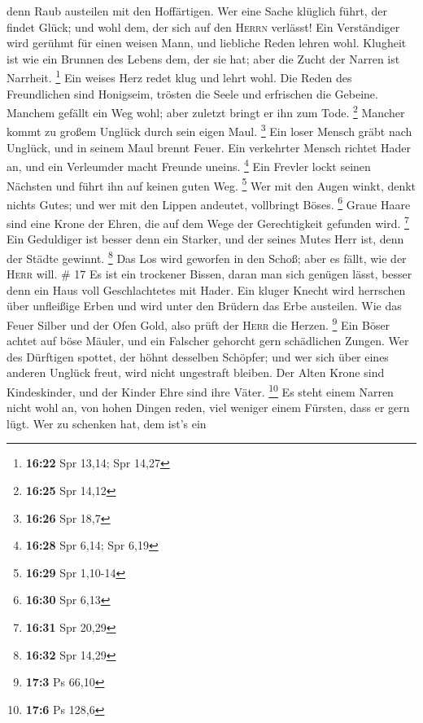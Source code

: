 denn Raub austeilen mit den Hoffärtigen.  Wer eine Sache
klüglich führt, der findet Glück; und wohl dem, der sich auf den
\textsc{Herrn} verlässt!  Ein Verständiger wird gerühmt
für einen weisen Mann, und liebliche Reden lehren wohl. 
Klugheit ist wie ein Brunnen des Lebens dem, der sie hat; aber die Zucht
der Narren ist Narrheit. \footnote{\textbf{16:22} Spr 13,14; Spr 14,27}
 Ein weises Herz redet klug und lehrt wohl.
 Die Reden des Freundlichen sind Honigseim, trösten die
Seele und erfrischen die Gebeine.  Manchem gefällt ein
Weg wohl; aber zuletzt bringt er ihn zum Tode. \footnote{\textbf{16:25}
  Spr 14,12}  Mancher kommt zu großem Unglück durch sein
eigen Maul. \footnote{\textbf{16:26} Spr 18,7}  Ein loser
Mensch gräbt nach Unglück, und in seinem Maul brennt Feuer.
 Ein verkehrter Mensch richtet Hader an, und ein
Verleumder macht Freunde uneins. \footnote{\textbf{16:28} Spr 6,14; Spr
  6,19}  Ein Frevler lockt seinen Nächsten und führt ihn
auf keinen guten Weg. \footnote{\textbf{16:29} Spr 1,10-14}
 Wer mit den Augen winkt, denkt nichts Gutes; und wer mit
den Lippen andeutet, vollbringt Böses. \footnote{\textbf{16:30} Spr 6,13}
 Graue Haare sind eine Krone der Ehren, die auf dem Wege
der Gerechtigkeit gefunden wird. \footnote{\textbf{16:31} Spr 20,29}
 Ein Geduldiger ist besser denn ein Starker, und der
seines Mutes Herr ist, denn der Städte gewinnt. \footnote{\textbf{16:32}
  Spr 14,29}  Das Los wird geworfen in den Schoß; aber es
fällt, wie der \textsc{Herr} will. \# 17  Es ist ein
trockener Bissen, daran man sich genügen lässt, besser denn ein Haus
voll Geschlachtetes mit Hader.  Ein kluger Knecht wird
herrschen über unfleißige Erben und wird unter den Brüdern das Erbe
austeilen.  Wie das Feuer Silber und der Ofen Gold, also
prüft der \textsc{Herr} die Herzen. \footnote{\textbf{17:3} Ps 66,10}
 Ein Böser achtet auf böse Mäuler, und ein Falscher
gehorcht gern schädlichen Zungen.  Wer des Dürftigen
spottet, der höhnt desselben Schöpfer; und wer sich über eines anderen
Unglück freut, wird nicht ungestraft bleiben.  Der Alten
Krone sind Kindeskinder, und der Kinder Ehre sind ihre Väter.
\footnote{\textbf{17:6} Ps 128,6}  Es steht einem Narren
nicht wohl an, von hohen Dingen reden, viel weniger einem Fürsten, dass
er gern lügt.  Wer zu schenken hat, dem ist's ein
